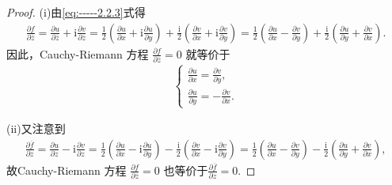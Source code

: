 \documentclass[../../main.tex]{subfiles}
\begin{document}
\begin{proof}
(i)由\eqref{eq:-----2.2.3}式得
\begin{align*}
\frac{\partial f}{\partial \overline{z}}=\frac{\partial u}{\partial \overline{z}} + \mathrm{i}\frac{\partial v}{\partial \overline{z}}=\frac{1}{2}\left(\frac{\partial u}{\partial x}+\mathrm{i}\frac{\partial u}{\partial y}\right)+\frac{\mathrm{i}}{2}\left(\frac{\partial v}{\partial x}+\mathrm{i}\frac{\partial v}{\partial y}\right)=\frac{1}{2}\left(\frac{\partial u}{\partial x}-\frac{\partial v}{\partial y}\right)+\frac{\mathrm{i}}{2}\left(\frac{\partial u}{\partial y}+\frac{\partial v}{\partial x}\right).
\end{align*}
因此，Cauchy-Riemann 方程 $\frac{\partial f}{\partial \overline{z}} = 0$ 就等价于
\begin{align*}
\begin{cases}
\frac{\partial u}{\partial x}=\frac{\partial v}{\partial y},\\
\frac{\partial u}{\partial y}=-\frac{\partial v}{\partial x}.
\end{cases}
\end{align*}

(ii)又注意到
\begin{align*}
\frac{\partial \overline{f}}{\partial z}=\frac{\partial u}{\partial z}-\mathrm{i}\frac{\partial v}{\partial z}=\frac{1}{2}\left( \frac{\partial u}{\partial x}-\mathrm{i}\frac{\partial u}{\partial y} \right) -\frac{\mathrm{i}}{2}\left( \frac{\partial v}{\partial x}-\mathrm{i}\frac{\partial v}{\partial y} \right) =\frac{1}{2}\left( \frac{\partial u}{\partial x}-\frac{\partial v}{\partial y} \right) -\frac{\mathrm{i}}{2}\left( \frac{\partial u}{\partial y}+\frac{\partial v}{\partial x} \right) ,
\end{align*}
故Cauchy-Riemann 方程 $\frac{\partial f}{\partial \overline{z}} = 0$ 也等价于$\frac{\partial \overline{f}}{\partial z}=0.$


\end{proof}
\end{document}
